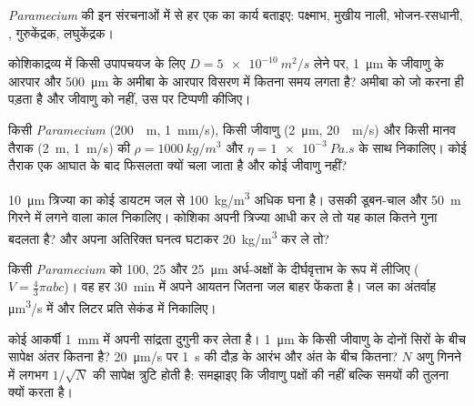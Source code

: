 \begin{exercise}[$\star$]\label{exo:b2:unicellular-diversity:4}
\emph{Paramecium} की इन संरचनाओं में से हर एक का कार्य बताइए: पक्ष्माभ,
मुखीय नाली, भोजन-रसधानी, , गुरुकेंद्रक, लघुकेंद्रक।
\end{exercise}

\begin{exercise}[$\star\star$]\label{exo:b2:unicellular-diversity:5}
कोशिकाद्रव्य में किसी उपापचयज के लिए $D = \qty{5e-10}{m^2/s}$ लेने पर,
\qty{1}{\micro m} के जीवाणु के आरपार और \qty{500}{\micro m} के अमीबा के
आरपार विसरण में कितना समय लगता है? अमीबा को जो करना ही पड़ता है और
जीवाणु को नहीं, उस पर टिप्पणी कीजिए।
\end{exercise}

\begin{exercise}[$\star\star$]\label{exo:b2:unicellular-diversity:6}
किसी \emph{Paramecium} (\qty{200}{\micro
m}, \qty{1}{mm/s}), किसी जीवाणु (\qty{2}{\micro m}, \qty{20}{\micro
m/s}) और किसी मानव तैराक (\qty{2}{m}, \qty{1}{m/s}) की 
$\rho = \qty{1000}{kg/m^3}$ और $\eta = \qty{1e-3}{Pa.s}$ के साथ
निकालिए। कोई तैराक एक आघात के बाद फिसलता क्यों चला जाता है और कोई जीवाणु
नहीं?
\end{exercise}

\begin{exercise}[$\star\star$]\label{exo:b2:unicellular-diversity:7}
\qty{10}{\micro m} त्रिज्या का कोई डायटम जल से \qty{100}{kg/m^3} अधिक
घना है। उसकी डूबन-चाल और \qty{50}{m} गिरने में लगने वाला काल निकालिए।
कोशिका अपनी त्रिज्या आधी कर ले तो यह काल कितने गुना बदलता है? और अपना
अतिरिक्त घनत्व घटाकर \qty{20}{kg/m^3} कर ले तो?
\end{exercise}

\begin{exercise}[$\star\star$]\label{exo:b2:unicellular-diversity:8}
किसी \emph{Paramecium} को \num{100}, \num{25} और \qty{25}{\micro m}
अर्ध-अक्षों के दीर्घवृत्ताभ के रूप में लीजिए ($V = \tfrac{4}{3}\pi abc$)।
वह हर \qty{30}{min} में अपने आयतन जितना जल बाहर फेंकता है। जल का अंतर्वाह
\unit{\micro m^3/s} में और लिटर प्रति सेकंड में निकालिए।
\end{exercise}

\begin{exercise}[$\star\star$]\label{exo:b2:unicellular-diversity:9}
कोई आकर्षी \qty{1}{mm} में अपनी सांद्रता दुगुनी कर लेता है।
\qty{1}{\micro m} के किसी जीवाणु के दोनों सिरों के बीच सापेक्ष अंतर कितना
है? \qty{20}{\micro m/s} पर \qty{1}{s} की दौड़ के आरंभ और अंत के बीच
कितना? $N$ अणु गिनने में लगभग $1/\sqrt{N}$ की सापेक्ष त्रुटि होती है:
समझाइए कि जीवाणु पक्षों की नहीं बल्कि समयों की तुलना क्यों करता है।
\end{exercise}

